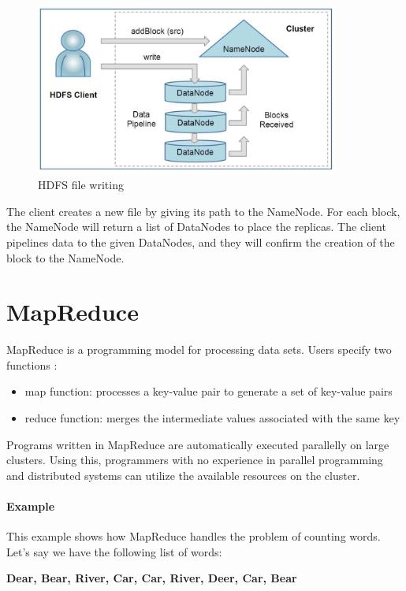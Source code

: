 \begin{figure}[H]
	\includegraphics[width=100mm, keepaspectratio]{figures/hdfs_client.png}
	\centering
	\caption{HDFS file writing  \cite{Shvachko:2010:HDF:1913798.1914427}}
\end{figure}
The client creates a new file by giving its path to the NameNode. For each block, the NameNode will return a list of DataNodes to place the replicas. The client pipelines data to the given DataNodes, and they will confirm the creation of the block to the NameNode.

\section{MapReduce}
MapReduce is a programming model for processing data sets. Users specify two functions \cite{Dean:2004:MSD:1251254.1251264}:
\begin{itemize}
	\item map function: processes a key-value pair to generate a set of key-value pairs
	\item reduce function: merges the intermediate values associated with the same key
\end{itemize}

Programs written in MapReduce are automatically executed parallelly on large clusters. Using this, programmers with no experience in parallel programming and distributed systems can utilize the available resources on the cluster.
\paragraph{Example \cite{MapReduce-example} \label{example}}
This example shows how MapReduce handles the problem of counting words. Let's say we have the following list of words: 
\begin{center}
	\textbf{Dear, Bear, River, Car, Car, River, Deer, Car, Bear}
\end{center}


